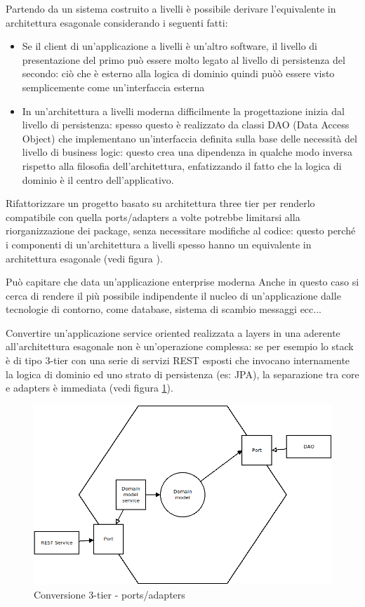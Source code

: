 Partendo da un sistema costruito a livelli è possibile derivare l'equivalente in architettura esagonale considerando i seguenti fatti:
\begin{itemize}
	\item Se il client di un'applicazione a livelli è un'altro software, il livello di presentazione del primo può essere molto legato al livello di persistenza del secondo: ciò che è esterno alla logica di dominio quindi puòò essere visto semplicemente come un'interfaccia esterna
	\item In un'architettura a livelli moderna difficilmente la progettazione inizia dal livello di persistenza: spesso questo è realizzato da classi DAO (Data Access Object) che implementano un'interfaccia definita sulla base delle necessità del livello di business logic: questo crea una dipendenza in qualche modo inversa rispetto alla filosofia dell'architettura, enfatizzando il fatto che la logica di dominio è il centro dell'applicativo.
\end{itemize}

Rifattorizzare un progetto basato su architettura three tier per renderlo compatibile con quella ports/adapters a volte potrebbe limitarsi alla riorganizzazione dei package, senza necessitare modifiche al codice: questo perché i componenti di un'architettura a livelli spesso hanno un equivalente in architettura esagonale (vedi figura ).


Può capitare che data un'applicazione enterprise moderna
Anche in questo caso si cerca di rendere il più possibile indipendente il nucleo di un'applicazione dalle tecnologie di contorno, come database, sistema di scambio messaggi ecc...


Convertire un'applicazione service oriented realizzata a layers in una aderente all'architettura esagonale non è un'operazione complessa: se per esempio lo stack è di tipo 3-tier con una serie di servizi REST esposti che invocano internamente la logica di dominio ed uno strato di persistenza (es: JPA), la separazione tra core e adapters è immediata (vedi figura \ref{fig:hexagonal_3_tier}).

\begin{figure}[h]
	\centering
	\includegraphics[scale=0.5]{img/hexagonal_3_tier}
	\caption{Conversione 3-tier - ports/adapters}
	\label{fig:hexagonal_3_tier}
\end{figure}

